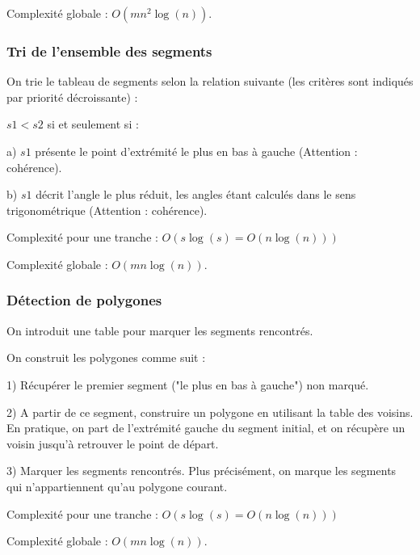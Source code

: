 \documentclass{article}
\begin{document}
Complexité globale : $O(mn^{2}\log(n))$.

\subsubsection{Tri de l'ensemble des segments}

On trie le tableau de segments selon la relation suivante (les critères sont indiqués par priorité décroissante) :

$s1 < s2$ si et seulement si :

a) $s1$ présente le point d’extrémité le plus en bas à gauche (Attention : cohérence).

b) $s1$ décrit l'angle le plus réduit, les angles étant calculés dans le sens trigonométrique (Attention : cohérence).

Complexité pour une tranche : $O(s\log(s) = O(n\log(n)))$

Complexité globale : $O(mn\log(n))$.

\subsubsection{Détection de polygones}

On introduit une table pour marquer les segments rencontrés.

On construit les polygones comme suit :

1) Récupérer le premier segment ("le plus en bas à gauche") non marqué.

2) A partir de ce segment, construire un polygone en utilisant la table des voisins. En pratique, on part de l'extrémité gauche du segment initial, et on récupère un voisin jusqu'à retrouver le point de départ.

3) Marquer les segments rencontrés. Plus précisément, on marque les segments qui n'appartiennent qu'au polygone courant.

Complexité pour une tranche : $O(s\log(s) = O(n\log(n)))$

Complexité globale : $O(mn\log(n))$.
\end{document}
